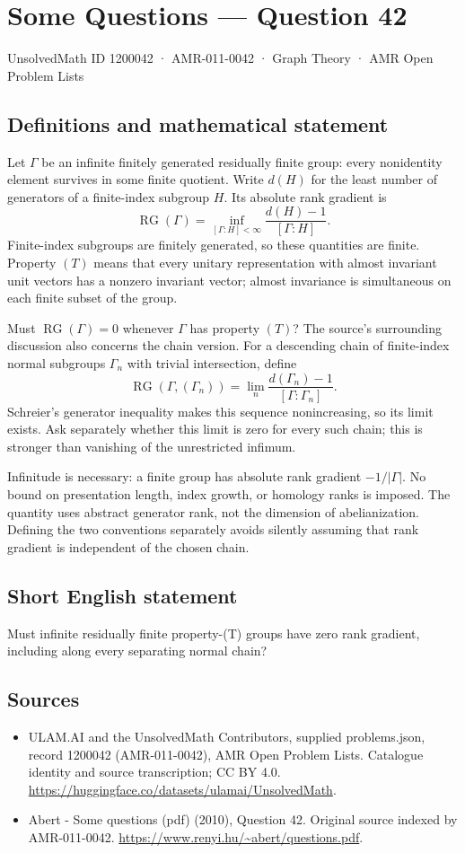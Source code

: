 \documentclass[11pt,a4paper]{article}
\begin{document}
\section*{Some Questions — Question 42}\label{1200042}
{\small UnsolvedMath ID 1200042 · AMR-011-0042 · Graph Theory · AMR Open Problem Lists}
\subsection{Definitions and mathematical statement}
Let $\Gamma$ be an infinite finitely generated residually finite group: every nonidentity element survives in some finite quotient. Write $d(H)$ for the least number of generators of a finite-index subgroup $H$. Its absolute rank gradient is
\[
 \operatorname{RG}(\Gamma)=\inf_{[\Gamma:H]<\infty}
                         \frac{d(H)-1}{[\Gamma:H]}.
\]
Finite-index subgroups are finitely generated, so these quantities are finite. Property $(T)$ means that every unitary representation with almost invariant unit vectors has a nonzero invariant vector; almost invariance is simultaneous on each finite subset of the group.

Must $\operatorname{RG}(\Gamma)=0$ whenever $\Gamma$ has property $(T)$? The source's surrounding discussion also concerns the chain version. For a descending chain of finite-index normal subgroups $\Gamma_n$ with trivial intersection, define
\[
 \operatorname{RG}(\Gamma,(\Gamma_n))=
 \lim_n\frac{d(\Gamma_n)-1}{[\Gamma:\Gamma_n]}.
\]
Schreier's generator inequality makes this sequence nonincreasing, so its limit exists. Ask separately whether this limit is zero for every such chain; this is stronger than vanishing of the unrestricted infimum.

Infinitude is necessary: a finite group has absolute rank gradient $-1/|\Gamma|$. No bound on presentation length, index growth, or homology ranks is imposed. The quantity uses abstract generator rank, not the dimension of abelianization. Defining the two conventions separately avoids silently assuming that rank gradient is independent of the chosen chain.
\subsection{Short English statement}
Must infinite residually finite property-(T) groups have zero rank gradient, including along every separating normal chain?
\subsection{Sources}
\begin{itemize}
\item[S1] ULAM.AI and the UnsolvedMath Contributors, supplied problems.json, record 1200042 (AMR-011-0042), AMR Open Problem Lists. Catalogue identity and source transcription; CC BY 4.0.
\url{https://huggingface.co/datasets/ulamai/UnsolvedMath}.
\item[S2] Abert - Some questions (pdf) (2010), Question 42. Original source indexed by AMR-011-0042.
\url{https://www.renyi.hu/~abert/questions.pdf}.
\end{itemize}
\end{document}
